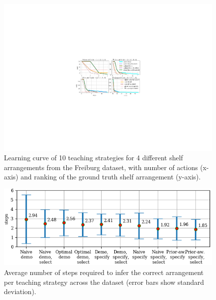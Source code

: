 \begin{figure}[htp]
	\centering
	\includegraphics[width=\linewidth]{figures/rankVsSteps-new}
	\caption{Learning curve of 10 teaching strategies for 4 different shelf arrangements from the Freiburg dataset, with number of actions (x-axis) and ranking of the ground truth shelf arrangement (y-axis). %
	}
	\label{fig:rankVSsteps}
\end{figure}

\begin{figure}[htp]
	\centering
	\includegraphics[width=\linewidth]{figures/avgSteps-certain-data}
	\caption{Average number of steps required to infer the correct arrangement per teaching strategy across the dataset (error bars show standard deviation).}
	\label{fig:avgSteps}
\end{figure}


